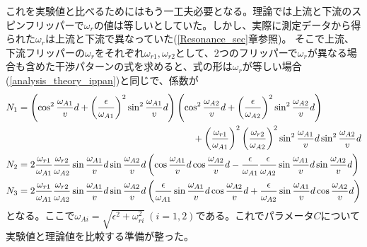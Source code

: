 これを実験値と比べるためにはもう一工夫必要となる。理論では上流と下流のスピンフリッパーで$\omega_r$の値は等しいとしていた。しかし、実際に測定データから得られた$\omega_r$は上流と下流で異なっていた(\ref{Resonance_sec}章参照)。%
そこで上流、下流フリッパーの$\omega_r$をそれぞれ$\omega_{r1},\omega_{r2}$として、2つのフリッパーで$\omega_r$が異なる場合も含めた干渉パターンの式を求めると、式の形は$\omega_r$が等しい場合(\ref{analysis_theory_ippan})と同じで、係数が
\begin{align}
&N_1 = \left(\cos^2 \frac{\omega_{A1}}{v}d +\left(\frac{\epsilon}{\omega_{A1}}\right)^2\sin^2 \frac{\omega_{A1}}{v}d\right)\left(\cos^2 \frac{\omega_{A2}}{v}d+\left(\frac{\epsilon}{\omega_{A2}}\right)^2 \sin^2 \frac{\omega_{A2}}{v}d\right)\\ \notag
&\hspace{7cm}+\left(\frac{\omega_{r1}}{\omega_{A1}}\right)^2\left(\frac{\omega_{r2}}{\omega_{A2}}\right)^2 \sin^2 \frac{\omega_{A1}}{v}d \sin^2 \frac{\omega_{A2}}{v}d\\
&N_2 = 2\frac{\omega_{r1}}{\omega_{A1}}\frac{\omega_{r2}}{\omega_{A2}}\sin\frac{\omega_{A1}}{v}d\sin\frac{\omega_{A2}}{v}d \left(\cos \frac{\omega_{A1}}{v}d\cos \frac{\omega_{A2}}{v}d -\frac{\epsilon}{\omega_{A1}}\frac{\epsilon}{\omega_{A2}} \sin \frac{\omega_{A1}}{v}d\sin \frac{\omega_{A2}}{v}d\right) \\
&N_3 = 2\frac{\omega_{r1}}{\omega_{A1}}\frac{\omega_{r2}}{\omega_{A2}}\sin\frac{\omega_{A1}}{v}d\sin\frac{\omega_{A2}}{v}d \left(\frac{\epsilon}{\omega_{A1}}\sin \frac{\omega_{A1}}{v}d\cos \frac{\omega_{A2}}{v}d +\frac{\epsilon}{\omega_{A2}} \sin \frac{\omega_{A1}}{v}d\cos \frac{\omega_{A2}}{v}d\right)
\end{align}\label{analysis_theory_ippanippan}
となる。ここで$\omega_{Ai}=\sqrt{\epsilon^2+\omega_{ri}^2} \ (i=1,2)$である。これでパラメータ$C$について実験値と理論値を比較する準備が整った。

